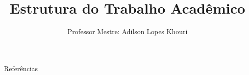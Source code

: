 \documentclass[compress, hyperref={pdfpagelayout=SinglePage}]{beamer}
\title[TCC II - Aula 01]{Estrutura do Trabalho Acadêmico}
\author{Professor Mestre: Adilson Lopes Khouri}
\begin{document}
	\begin{frame}
		\titlepage
	\end{frame}
	
	
	
	
	
	
	
	
	
	
		
	

	
	
	
	
		
	
		
		
		
				
	

	


\begin{frame}{}
	\begin{block}{Referências}
		
    		
	\end{block}
\end{frame}
\end{document}

